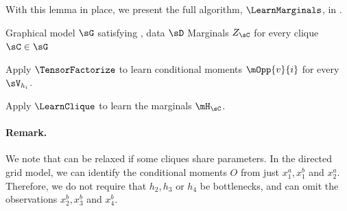 With this lemma in place, we present the full algorithm, $\LearnMarginals$,
in .

\begin{algorithm}
  \caption{\LearnMarginals}
  \label{algo:directed}
  \begin{algorithmic}
    \REQUIRE Graphical model $\sG$ satisfying , data $\sD$
    \ENSURE Marginals $Z_\sC$ for every clique $\sC \in \sG$

        \STATE Apply $\TensorFactorize$ to learn conditional moments
        $\mOpp{v}{i}$ for every $\sV_{h_i}$.

      \ENDFOR
\STATE Apply $\LearnClique$ to learn the marginals $\mH_\sC$.
\ENDFOR
  \end{algorithmic}
\end{algorithm}



\paragraph{Remark.} We note that  can be relaxed if some cliques
  share parameters.
In the directed grid model, we can identify the conditional moments $O$ from just
  $x^a_1, x^b_1$ and $x^a_2$.
  Therefore, we do not require that $h_2, h_3$ or $h_4$
  be bottlenecks, and can omit the observations $x^b_2, x^b_3$ and $x^b_4$.

